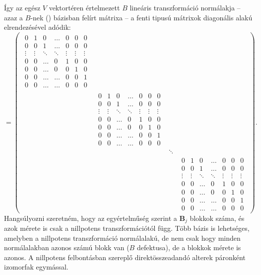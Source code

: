 \documentclass[9pt, a4paper, showtrims]{memoir}
\theoremstyle{plain}
\theoremstyle{remark}
\theoremstyle{definition}
\begin{document}
Így az egész $V$ vektortéren értelmezett $B$ lineáris transzformáció normálakja 
--
azaz a $B$-nek (\dag) bázisban felírt mátrixa 
-- 
a fenti tipusú mátrixok diagonális alakú elrendezésével adódik:
\begin{displaymath}
    [B]=
    \begin{pmatrix}
        \begin{matrix}
            0&1&0&\dots& 0 &0&0\\
            0&0&1&\dots& 0 &0&0\\
            \vdots&\vdots&\ddots&\ddots&\vdots&\vdots&\vdots\\
            0&0&\dots&0& 1 &0&0\\
            0&0&\dots&0& 0 &1&0\\
            0&0&\dots&\dots& 0 &0&1\\
            0&0&\dots&\dots& 0 &0&0
        \end{matrix}&&&\\
        &
        \begin{matrix}
            0&1&0&\dots& 0 &0&0\\
            0&0&1&\dots& 0 &0&0\\
            \vdots&\vdots&\ddots&\ddots&\vdots&\vdots&\vdots\\
            0&0&\dots&0& 1 &0&0\\
            0&0&\dots&0& 0 &1&0\\
            0&0&\dots&\dots& 0 &0&1\\
            0&0&\dots&\dots& 0 &0&0
        \end{matrix}
        &&\\
        &&\ddots&\\
        &&&
        \begin{matrix}
            0&1&0&\dots& 0 &0&0\\
            0&0&1&\dots& 0 &0&0\\
            \vdots&\vdots&\ddots&\ddots&\vdots&\vdots&\vdots\\
            0&0&\dots&0& 1 &0&0\\
            0&0&\dots&0& 0 &1&0\\
            0&0&\dots&\dots& 0 &0&1\\
            0&0&\dots&\dots& 0 &0&0
        \end{matrix}
    \end{pmatrix}.
\end{displaymath}
Hangsúlyozni szeretném, hogy az egyértelműség szerint a $\mathbf{B}_j$ blokkok száma, és azok mérete is csak
a nillpotens transzformációtól függ.
Több bázis is lehetséges, amelyben a nillpotens transzformáció normálalakú, 
de nem csak hogy minden normálalakban azonos számú blokk van ($B$ defektusa), 
de a blokkok mérete is azonos.
A nillpotens felbontásban szereplő direktösszeadandó alterek páronként izomorfak egymással.
\end{document}
